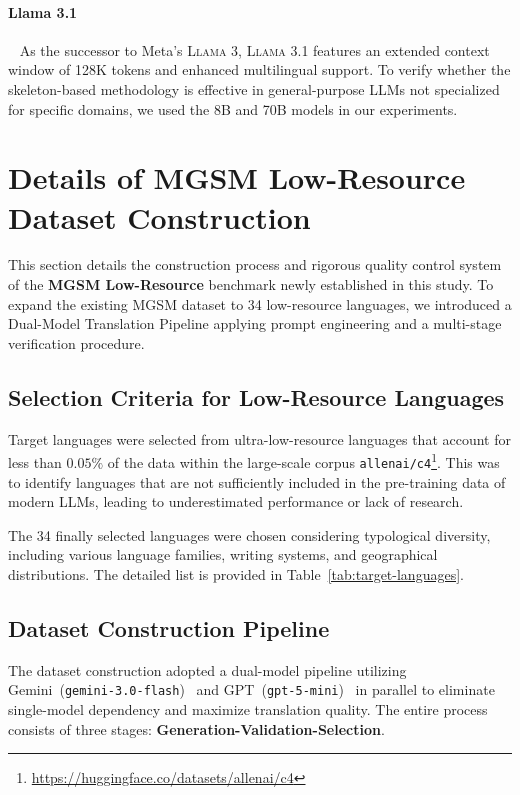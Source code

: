 \paragraph{Llama 3.1}~\citep{grattafiori2024llama3herdmodels}
As the successor to Meta's \textsc{Llama 3}, \textsc{Llama 3.1} features an extended context window of 128K tokens and enhanced multilingual support. To verify whether the skeleton-based methodology is effective in general-purpose LLMs not specialized for specific domains, we used the 8B and 70B models in our experiments.


\section{Details of MGSM Low-Resource Dataset Construction}
\label{appendix:mgsm-translation}

This section details the construction process and rigorous quality control system of the \textbf{MGSM Low-Resource} benchmark newly established in this study. To expand the existing MGSM dataset to 34 low-resource languages, we introduced a Dual-Model Translation Pipeline applying prompt engineering and a multi-stage verification procedure.

\subsection{Selection Criteria for Low-Resource Languages}
Target languages were selected from ultra-low-resource languages that account for less than $0.05\%$ of the data within the large-scale corpus \texttt{allenai/c4}\footnote{\url{https://huggingface.co/datasets/allenai/c4}}. This was to identify languages that are not sufficiently included in the pre-training data of modern LLMs, leading to underestimated performance or lack of research.

The 34 finally selected languages were chosen considering typological diversity, including various language families, writing systems, and geographical distributions. The detailed list is provided in Table~\ref{tab:target-languages}.



\subsection{Dataset Construction Pipeline}
The dataset construction adopted a dual-model pipeline utilizing Gemini~(\texttt{gemini-3.0-flash})~\citep{geminiteam2025geminifamilyhighlycapable} and GPT~(\texttt{gpt-5-mini})~\citep{openai2024gpt4technicalreport} in parallel to eliminate single-model dependency and maximize translation quality. The entire process consists of three stages: \textbf{Generation-Validation-Selection}.

